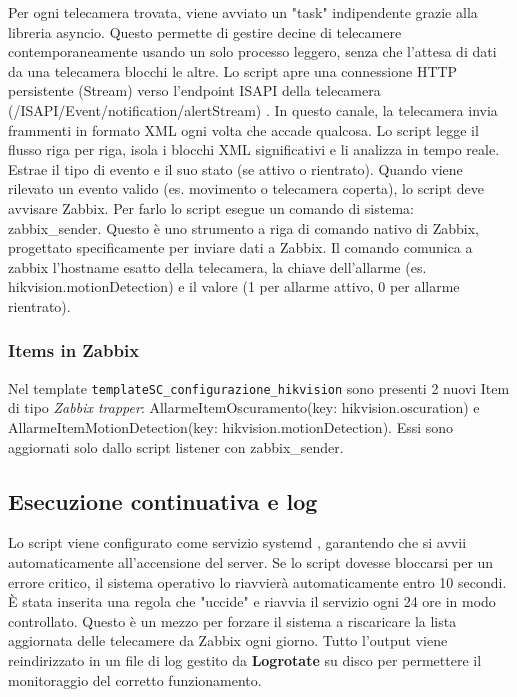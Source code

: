 \documentclass[12pt, a4paper, oneside]{report}
\begin{document}
Per ogni telecamera trovata, viene avviato un "task" indipendente grazie alla libreria asyncio.
Questo permette di gestire decine di telecamere contemporaneamente usando un solo processo leggero,
senza che l'attesa di dati da una telecamera blocchi le altre.
Lo script apre una connessione HTTP persistente (Stream) verso l'endpoint ISAPI della telecamera (/ISAPI/Event/notification/alertStream) \parencite{hikvision_isapi_main}.
In questo canale, la telecamera invia frammenti in formato XML ogni volta che accade qualcosa.
Lo script legge il flusso riga per riga, isola i blocchi XML significativi e li analizza in tempo reale.
Estrae il tipo di evento e il suo stato (se attivo o rientrato).
Quando viene rilevato un evento valido (es. movimento o telecamera coperta), lo script deve avvisare Zabbix.
Per farlo lo script esegue un comando di sistema: zabbix\_sender.
Questo è uno strumento a riga di comando nativo di Zabbix,
progettato specificamente per inviare dati a Zabbix.
Il comando comunica a zabbix l'hostname esatto della telecamera, la chiave dell'allarme
(es. hikvision.motionDetection) e il valore (1 per allarme attivo, 0 per allarme rientrato).

\subsubsection{Items in Zabbix}
Nel template \texttt{templateSC\_configurazione\_hikvision} sono presenti 2 nuovi Item di tipo \emph{Zabbix trapper}:
AllarmeItemOscuramento(key: hikvision.oscuration) e AllarmeItemMotionDetection(key: hikvision.motionDetection). %
Essi sono aggiornati solo dallo script listener con zabbix\_sender.

\subsection{Esecuzione continuativa e log}

Lo script viene configurato come servizio systemd \parencite{man_systemd}, garantendo che si avvii automaticamente all'accensione del server.
Se lo script dovesse bloccarsi per un errore critico, il sistema operativo lo riavvierà automaticamente entro 10 secondi.
È stata inserita una regola che "uccide" e riavvia il servizio ogni 24 ore in modo controllato.
Questo è un mezzo per forzare il sistema a riscaricare la lista aggiornata delle telecamere da Zabbix ogni giorno.
Tutto l'output viene reindirizzato in un file di log gestito da \textbf{Logrotate} \parencite{man_logrotate} su disco per permettere il monitoraggio del corretto funzionamento.
\end{document}

